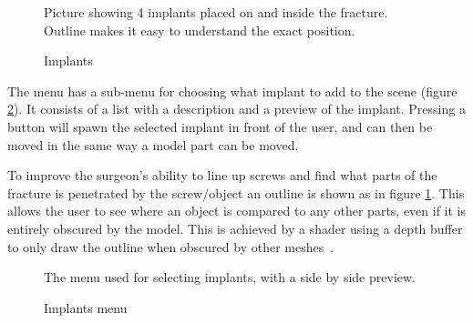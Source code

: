 \documentclass[a4paper]{report}
\begin{document}
\begin{figure}[h!]
    \centering
	\hfill
	\caption{Implants}\label{implants}
  \small
  Picture showing 4 implants placed on and inside the fracture. Outline makes it easy to understand the exact position.
\end{figure}

The menu has a sub-menu for choosing what implant to add to the scene (figure \ref{implantsmenu}). It consists of a list with a description and a preview of the implant. Pressing a button will spawn the selected implant in front of the user, and can then be moved in the same way a model part can be moved.

To improve the surgeon's ability to line up screws and find what parts of the fracture is penetrated by the screw/object an outline is shown as in figure \ref{implants}. This allows the user to see where an object is compared to any other parts, even if it is entirely obscured by the model. This is achieved by a shader using a depth buffer to only draw the outline when obscured by other meshes~\cite{technologies_unity_nodate-1}.

\begin{figure}[h!]
    \centering
	\hfill
	\caption{Implants menu}\label{implantsmenu}
  \small
  The menu used for selecting implants, with a side by side preview.
\end{figure}
\end{document}
